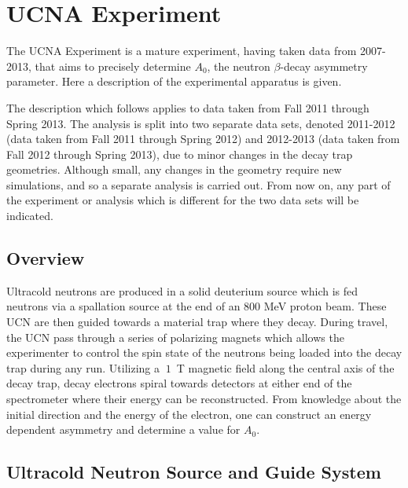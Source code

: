 \chapter{UCNA Experiment}
\label{ch:UCNA_Experiment}

The UCNA Experiment is a mature experiment, having taken data from
2007-2013, that aims to precisely determine $A_{0}$, the neutron
$\beta$-decay asymmetry parameter. Here a description of the experimental
apparatus is given.

The description which follows applies to data taken from Fall 2011 through
Spring 2013. The analysis is split into two separate data sets, denoted
2011-2012 (data taken from Fall 2011 through Spring 2012)
and 2012-2013 (data taken from Fall 2012 through Spring 2013),
due to minor changes in the decay trap geometries. Although
small, any changes in the geometry require new simulations, and so a separate
analysis is carried out. From now on, any part of the experiment or analysis
which is different for the two data sets will be indicated.

\section{Overview}
\label{sec:Overview}

Ultracold neutrons are produced in a solid deuterium source which is fed
neutrons via a spallation source at the end of an $800$ MeV
proton beam. These UCN are then guided towards a material trap where they
decay. During travel, the UCN pass through a series of polarizing magnets
which allows the experimenter to control the spin state of the neutrons being
loaded into
the decay trap during any run.
Utilizing a $~1$~T magnetic field along the central
axis of the decay trap, decay electrons
spiral towards detectors at either end of
the spectrometer where their energy can be reconstructed. From knowledge about
the initial direction and the energy of the electron, one can construct an
energy dependent asymmetry and determine a value for $A_{0}$.

\section{Ultracold Neutron Source and Guide System}

